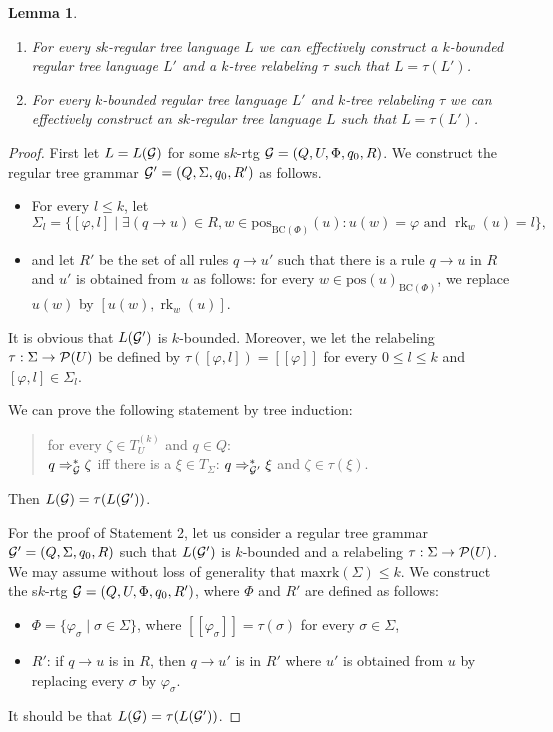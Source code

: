 \documentclass[10pt]{scrartcl}
\newtheorem{lm}[df]{Lemma}
\newcommand{\seml}{[\![}
\newcommand{\semr}{]\!]}
\newcommand{\pos}{\mathrm{pos}}
\newcommand{\maxrk}{{\mathrm{maxrk}}}
\newcommand{\BC}{\mathrm{BC}}
\newcommand{\G}{{\cal G}}
\newcommand{\PS}{{\cal P}}
\DeclareMathOperator{\rk}{rk}
\def\ui#1{^{(#1)}}
\begin{document}
\begin{lm}\label{lm:srtg-alph}\rm $\ $
\begin{enumerate}
\item For every s$k$-regular tree
  language $L$ we can effectively construct a $k$-bounded regular tree
  language $L'$ and a $k$-tree relabeling $\tau$ such that $L =
  \tau(L')$. 
\item For every  $k$-bounded regular tree language $L'$ and
  $k$-tree relabeling $\tau$ we can effectively construct an
  s$k$-regular tree language $L$ such that  $L =
  \tau(L')$.
\end{enumerate}
\end{lm}
\begin{proof} First let $L = L(\G)$ for some s$k$-rtg $\G = (Q,U,\Phi,q_0,R)$. We construct the regular tree grammar $\G' = (Q,\Sigma,q_0,R')$ as follows.
\begin{itemize}
\item For every $l\le k$, let $$\Sigma_l = \{ [\varphi,l] \mid \exists (q \rightarrow u) \in R, 
w \in \pos_{\BC(\Phi)}(u):  u(w) = \varphi \text{ and } \rk_w(u) = l\},$$ 
\item and let $R'$ be the set of all rules $q \rightarrow u'$ such
  that there is a rule $q \rightarrow u$ in $R$ and $u'$ is obtained from $u$ as follows:
for every $w\in \pos(u)_{\BC(\Phi)}$, we replace $u(w)$ by $[u(w),\rk_w(u)]$.
\end{itemize}
It is obvious that $L(\G')$ is $k$-bounded. Moreover, we let the relabeling $\tau: \Sigma \rightarrow {\cal P}(U)$ be defined by $\tau([\varphi,l]) = \seml \varphi \semr$
for every $0\le l\le k$ and $[\varphi,l] \in \Sigma_l$.

We can prove the following statement by tree induction: 

\begin{quote}
for every $\zeta \in T_U\ui k$ and $q \in Q$:\\
$q \Rightarrow_{\cal G}^* \zeta$ \;  iff \; 
there is a $\xi \in T_\Sigma$: $q \Rightarrow_{\G'}^* \xi$ and $\zeta \in \tau(\xi)$.
\end{quote} 
Then $L(\G) = \tau(L(\G'))$. 

For the proof of Statement 2,  let us consider a regular tree grammar  $\G' = (Q,\Sigma,q_0,R)$ such that $L(\G')$ is $k$-bounded and a relabeling $\tau: \Sigma \to \PS(U)$. We may assume without loss of generality that  $\maxrk(\Sigma)\le k$. We construct the s$k$-rtg $\G = (Q,U,\Phi,q_0,R')$, where $\Phi$ and $R'$ are defined as follows:
\begin{itemize}
\item $\Phi=\{ \varphi_\sigma \mid \sigma \in \Sigma\}$, where $\seml \varphi_\sigma \semr =\tau(\sigma)$ for every $\sigma \in\Sigma$, 
\item $R'$:  if $q \rightarrow u$ is in $R$, then $q \rightarrow u'$ is in $R'$ where $u'$ is obtained from $u$ by replacing every $\sigma$ by $\varphi_\sigma$. 
\end{itemize}
It should be that $L(\G)=\tau(L(\G'))$.
\end{proof}
\end{document}

